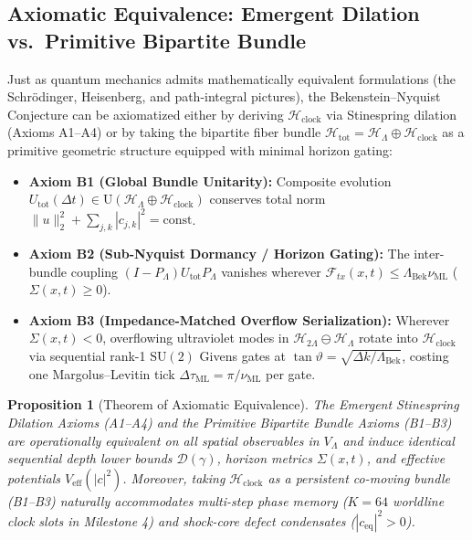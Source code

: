 \documentclass[11pt,a4paper]{article}
\newtheorem{proposition}[theorem]{Proposition}
\theoremstyle{definition}
\begin{document}
\subsection{Axiomatic Equivalence: Emergent Dilation vs.\ Primitive Bipartite Bundle}
\label{subsec:axiomatic-equivalence}
Just as quantum mechanics admits mathematically equivalent formulations (the Schr\"odinger, Heisenberg, and path-integral pictures), the Bekenstein--Nyquist Conjecture can be axiomatized either by deriving $\mathcal{H}_{\text{clock}}$ via Stinespring dilation~\cite{stinespring1955} (Axioms A1--A4) or by taking the bipartite fiber bundle $\mathcal{H}_{\text{tot}} = \mathcal{H}_{\Lambda} \oplus \mathcal{H}_{\text{clock}}$ as a primitive geometric structure equipped with minimal horizon gating:
\begin{itemize}
\item \textbf{Axiom B1 (Global Bundle Unitarity):} Composite evolution $U_{\text{tot}}(\Delta t) \in \mathrm{U}(\mathcal{H}_{\Lambda} \oplus \mathcal{H}_{\text{clock}})$ conserves total norm $\|u\|_2^2 + \sum_{j,k} |c_{j,k}|^2 = \mathrm{const}$.
\item \textbf{Axiom B2 (Sub-Nyquist Dormancy / Horizon Gating):} The inter-bundle coupling $(I - P_{\Lambda}) U_{\text{tot}} P_{\Lambda}$ vanishes wherever $\mathcal{F}_{tx}(x,t) \le \Lambda_{\text{Bek}}\nu_{\text{ML}}$ ($\Sigma(x,t) \ge 0$).
\item \textbf{Axiom B3 (Impedance-Matched Overflow Serialization):} Wherever $\Sigma(x,t) < 0$, overflowing ultraviolet modes in $\mathcal{H}_{2\Lambda} \ominus \mathcal{H}_{\Lambda}$ rotate into $\mathcal{H}_{\text{clock}}$ via sequential rank-1 $\mathrm{SU}(2)$ Givens gates at $\tan\vartheta = \sqrt{\Delta k / \Lambda_{\text{Bek}}}$, costing one Margolus--Levitin tick $\Delta\tau_{\text{ML}} = \pi/\nu_{\text{ML}}$ per gate.
\end{itemize}
\begin{proposition}[Theorem of Axiomatic Equivalence]
\label{prop:axiomatic-equivalence}
The Emergent Stinespring Dilation Axioms (A1--A4) and the Primitive Bipartite Bundle Axioms (B1--B3) are operationally equivalent on all spatial observables in $V_{\Lambda}$ and induce identical sequential depth lower bounds $\mathcal{D}(\gamma)$, horizon metrics $\Sigma(x,t)$, and effective potentials $V_{\text{eff}}(|c|^2)$. Moreover, taking $\mathcal{H}_{\text{clock}}$ as a persistent co-moving bundle (B1--B3) naturally accommodates multi-step phase memory ($K = 64$ worldline clock slots in Milestone 4) and shock-core defect condensates ($|c_{\text{eq}}|^2 > 0$).
\end{proposition}
\end{document}
